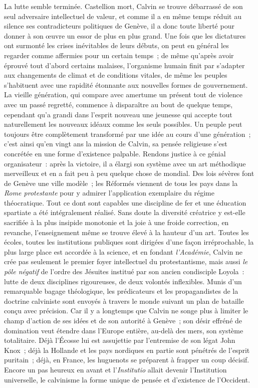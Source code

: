 \documentclass[french,twoside]{book} %
\newcommand\chaptercont{} %
\begin{document}
\chaptercont
\noindent La lutte semble terminée. Castellion mort, Calvin se trouve débarrassé de son seul adversaire intellectuel de valeur, et comme il a en même temps réduit au silence ses contradicteurs politiques de Genève, il a donc toute liberté pour donner à son œuvre un essor de plus en plus grand. Une fois que les dictatures ont surmonté les crises inévitables de leurs débuts, on peut en général les regarder comme affermies pour un certain temps ; de même qu’après avoir éprouvé tout d’abord certains malaises, l’organisme humain finit par s’adapter aux changements de climat et de conditions vitales, de même les peuples s’habituent avec une rapidité étonnante aux nouvelles formes de gouvernement. La vieille génération, qui compare avec amertume un présent tout de violence avec un passé regretté, commence à disparaître au bout de quelque temps, cependant qu’a grandi dans l’esprit nouveau une jeunesse qui accepte tout naturellement les nouveaux idéaux comme les seuls possibles. Un peuple peut toujours être complètement transformé par une idée au cours d’une génération ; c’est ainsi qu’en vingt ans la mission de Calvin, sa pensée religieuse s’est concrétée en une forme d’existence palpable. Rendons justice à ce génial organisateur : après la victoire, il a élargi son système avec un art méthodique merveilleux et en a fait peu à peu quelque chose de mondial. Des lois sévères font de Genève une ville modèle ; les Réformés viennent de tous les pays dans la \emph{Rome protestante} pour y admirer l’application exemplaire du régime théocratique. Tout ce dont sont capables une discipline de fer et une éducation spartiate a été intégralement réalisé. Sans doute la diversité créatrice y est-elle sacrifiée à la plus insipide monotonie et la joie à une froide correction, en revanche, l’enseignement même se trouve élevé à la hauteur d’un art. Toutes les écoles, toutes les institutions publiques sont dirigées d’une façon irréprochable, la plus large place est accordée à la science, et en fondant \emph{l’Académie}, Calvin ne crée pas seulement le premier foyer intellectuel du protestantisme, mais aussi \emph{le pôle négatif} de l’ordre des Jésuites institué par son ancien condisciple Loyola : lutte de deux disciplines rigoureuses, de deux volontés inflexibles. Munis d’un remarquable bagage théologique, les prédicateurs et les propagandistes de la doctrine calviniste sont envoyés à travers le monde suivant un plan de bataille conçu avec précision. Car il y a longtemps que Calvin ne songe plus à limiter le champ d’action de ses idées et de son autorité à Genève ; son désir effréné de domination veut étendre dans l’Europe entière, au-delà des mers, son système totalitaire. Déjà l’Écosse lui est assujettie par l’entremise de son légat John Knox ; déjà la Hollande et les pays nordiques en partie sont pénétrés de l’esprit puritain ; déjà, en France, les huguenots se préparent à frapper un coup décisif. Encore un pas heureux en avant et l’\emph{Institutio} allait devenir l’Institution universelle, le calvinisme la forme unique de pensée et d’existence de l’Occident.\par
\end{document}
